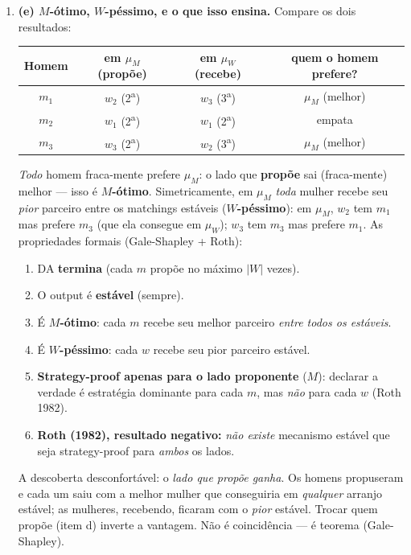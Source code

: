 \documentclass[11pt,a4paper]{article}
\begin{document}
\begin{enumerate}[leftmargin=2em,itemsep=4pt]
\item \textbf{(e) $M$-ótimo, $W$-péssimo, e o que isso ensina.} Compare os dois resultados:
\begin{center}\small
\begin{tabular}{@{}cccc@{}}
\toprule
Homem & em $\mu_M$ (propõe) & em $\mu_W$ (recebe) & quem o homem prefere? \\
\midrule
$m_1$ & $w_2$ (2\textsuperscript{a}) & $w_3$ (3\textsuperscript{a}) & $\mu_M$ (melhor) \\
$m_2$ & $w_1$ (2\textsuperscript{a}) & $w_1$ (2\textsuperscript{a}) & empata \\
$m_3$ & $w_3$ (2\textsuperscript{a}) & $w_2$ (3\textsuperscript{a}) & $\mu_M$ (melhor) \\
\bottomrule
\end{tabular}
\end{center}
\emph{Todo} homem fraca-mente prefere $\mu_M$: o lado que \textbf{propõe} sai (fraca-mente)
melhor — isso é $M$\textbf{-ótimo}. Simetricamente, em $\mu_M$ \emph{toda} mulher recebe seu
\emph{pior} parceiro entre os matchings estáveis ($W$\textbf{-péssimo}): em $\mu_M$, $w_2$ tem
$m_1$ mas prefere $m_3$ (que ela consegue em $\mu_W$); $w_3$ tem $m_3$ mas prefere $m_1$. As
propriedades formais (Gale-Shapley + Roth):
\begin{enumerate}[label=(\roman*),leftmargin=2.2em,itemsep=1pt,topsep=2pt]
\item DA \textbf{termina} (cada $m$ propõe no máximo $|W|$ vezes).
\item O output é \textbf{estável} (sempre).
\item É \textbf{$M$-ótimo}: cada $m$ recebe seu melhor parceiro \emph{entre todos os estáveis}.
\item É \textbf{$W$-péssimo}: cada $w$ recebe seu pior parceiro estável.
\item \textbf{Strategy-proof apenas para o lado proponente} ($M$): declarar a verdade é
estratégia dominante para cada $m$, mas \emph{não} para cada $w$ (Roth 1982).
\item \textbf{Roth (1982), resultado negativo:} \emph{não existe} mecanismo estável que seja
strategy-proof para \emph{ambos} os lados.
\end{enumerate}

\begin{empalavras}
A descoberta desconfortável: o \emph{lado que propõe ganha}. Os homens propuseram e cada um
saiu com a melhor mulher que conseguiria em \emph{qualquer} arranjo estável; as mulheres,
recebendo, ficaram com o \emph{pior} estável. Trocar quem propõe (item d) inverte a vantagem.
Não é coincidência — é teorema (Gale-Shapley).


\end{empalavras}
\end{enumerate}
\end{document}

